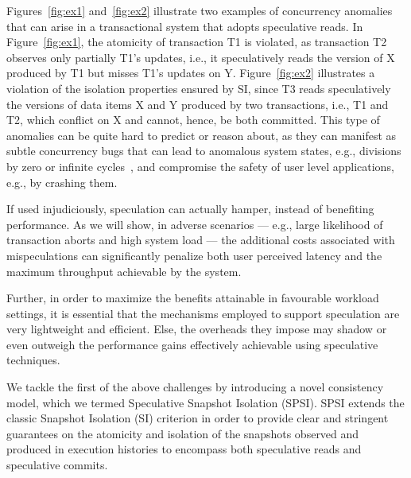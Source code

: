 Figures~\ref{fig:ex1} and~\ref{fig:ex2} illustrate two examples of concurrency anomalies that can arise in a transactional system that adopts speculative reads. In Figure~\ref{fig:ex1}, the atomicity of transaction T1 is violated, as transaction T2 observes only partially T1's updates, i.e., it speculatively reads the version of X produced by T1 but misses T1's updates on Y. Figure~\ref{fig:ex2} illustrates a violation of the isolation properties ensured by SI, since T3 reads speculatively the versions of data items X and Y  produced by two transactions, i.e., T1 and T2, which conflict on X and cannot, hence, be both committed. This type of anomalies can be quite hard to predict or reason about, as they can manifest as subtle concurrency bugs that can lead to anomalous system states, e.g., divisions by zero or infinite cycles~\cite{guerraoui2007opacity}, and compromise the safety of user level applications, e.g., by crashing them.

\vspace{4pt} If used injudiciously, speculation can actually hamper, instead of benefiting performance. As we will show, in adverse scenarios  --- e.g., large likelihood of transaction aborts and high system load --- the additional costs associated with mispeculations can significantly penalize both user perceived latency and the maximum throughput achievable by the system.

Further, in order to maximize the benefits attainable in favourable workload settings, it is essential that the mechanisms employed to support speculation are very lightweight and efficient. Else, the overheads they impose may shadow or even outweigh the performance gains effectively achievable using speculative techniques.


We tackle the first of the above challenges by introducing a novel consistency model, which we termed Speculative Snapshot Isolation (SPSI). SPSI extends the classic Snapshot  Isolation (SI) criterion in order to provide clear and stringent guarantees on the atomicity and isolation of the snapshots observed and produced in execution histories to encompass both speculative reads and speculative commits.  %

 
